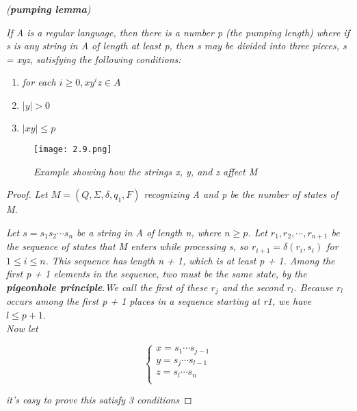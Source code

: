 \documentclass{article}
\begin{document}
\begin{lemma}
    \textit{(\textbf{pumping lemma})}

    \textit{If A is a regular language, then there is a number p (the
    pumping length) where if s is any string in A of length at least p, then s may be
    divided into three pieces, s = xyz, satisfying the following conditions:}

    \begin{enumerate}
        \item \textit{for each $i\geq0,xy^iz\in A$}
        \item \textit{$|y| > 0$}
        \item $|xy|\leq p$
    \end{enumerate}

    \begin{figure}[H]
        \begin{center}
            \texttt{[image: 2.9.png]}
        \end{center}
        \caption{\textit{Example showing how the strings x, y, and z affect M}}
    \end{figure}
    \newpage

    \begin{proof}
        \textit{Let $M = (Q,\Sigma,\delta,q_1,F)$ recognizing A and p be the number of states of M.}

        \textit{Let $s = s_1s_2\cdots s_n$ be a string in A of length n, where $n\geq p$. Let $r_1,r_2,\cdots,r_{n+1}$ be the sequence of states that M enters while processing s,
         so $r_{i+1} = \delta(r_i,s_i)$ for $1\leq i\leq n$. This sequence has length n + 1, which is at least p + 1. Among
         the first p + 1 elements in the sequence, two must be the same state, by the
         \textbf{pigeonhole principle}.We call the first of these $r_j$ and the second $r_l$. Because $r_l$
         occurs among the first p + 1 places in a sequence starting at r1, we have $l \leq p + 1$.
         \\Now let}

         \[  
            \begin{cases}
                x = s_1\cdots s_{j-1}\\
                y = s_j \cdots s_{l-1} \\
                z = s_l\cdots s_n \\
            \end{cases}
        \]

        \textit{it's easy to prove this satisfy 3 conditions}
    \end{proof}
\end{lemma}
\end{document}
